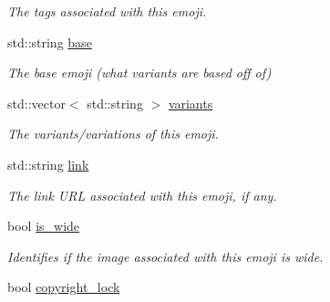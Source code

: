 \begin{DoxyCompactItemize}
\begin{DoxyCompactList}\small\item\em The tags associated with this emoji. \end{DoxyCompactList}\item 
std\+::string \hyperlink{classEmojidex_1_1Data_1_1Emoji_a91a8ecf38a8a36bda309ad290575c5e8}{base}
\begin{DoxyCompactList}\small\item\em The base emoji (what variants are based off of) \end{DoxyCompactList}\item 
std\+::vector$<$ std\+::string $>$ \hyperlink{classEmojidex_1_1Data_1_1Emoji_aa8550f5cba404cae07523abf7eba3ea8}{variants}\hypertarget{classEmojidex_1_1Data_1_1Emoji_aa8550f5cba404cae07523abf7eba3ea8}{}\label{classEmojidex_1_1Data_1_1Emoji_aa8550f5cba404cae07523abf7eba3ea8}

\begin{DoxyCompactList}\small\item\em The variants/variations of this emoji. \end{DoxyCompactList}\item 
std\+::string \hyperlink{classEmojidex_1_1Data_1_1Emoji_a0744da3356a9ad54a21f3f303fbae93b}{link}\hypertarget{classEmojidex_1_1Data_1_1Emoji_a0744da3356a9ad54a21f3f303fbae93b}{}\label{classEmojidex_1_1Data_1_1Emoji_a0744da3356a9ad54a21f3f303fbae93b}

\begin{DoxyCompactList}\small\item\em The link U\+RL associated with this emoji, if any. \end{DoxyCompactList}\item 
bool \hyperlink{classEmojidex_1_1Data_1_1Emoji_ae4151c475bae84ea410bfefd5ab2bd9d}{is\+\_\+wide}\hypertarget{classEmojidex_1_1Data_1_1Emoji_ae4151c475bae84ea410bfefd5ab2bd9d}{}\label{classEmojidex_1_1Data_1_1Emoji_ae4151c475bae84ea410bfefd5ab2bd9d}

\begin{DoxyCompactList}\small\item\em Identifies if the image associated with this emoji is wide. \end{DoxyCompactList}\item 
bool \hyperlink{classEmojidex_1_1Data_1_1Emoji_a95e1ae753363bddf0d063550262c811d}{copyright\+\_\+lock}\hypertarget{classEmojidex_1_1Data_1_1Emoji_a95e1ae753363bddf0d063550262c811d}{}\label{classEmojidex_1_1Data_1_1Emoji_a95e1ae753363bddf0d063550262c811d}


\end{DoxyCompactItemize}
